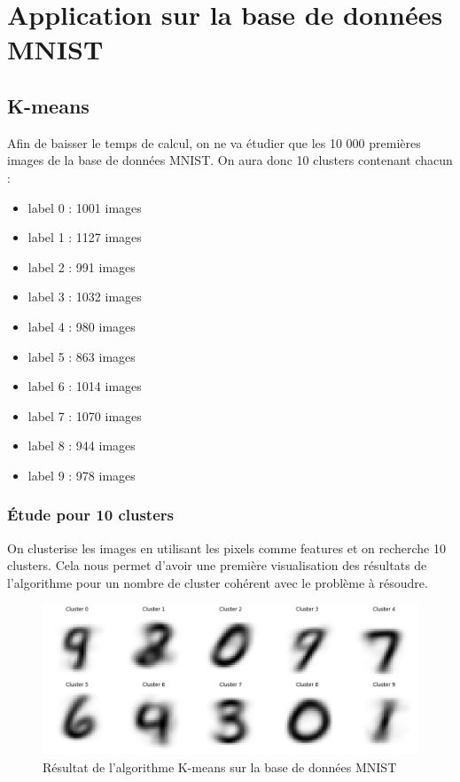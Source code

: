 \documentclass[french,a4paper,18pt]{article}
\begin{document}
\section{Application sur la base de données MNIST}
\subsection{K-means}

Afin de baisser le temps de calcul, on ne va étudier que les 10 000 premières images de la base de données MNIST.
On aura donc 10 clusters contenant chacun : 
\begin{itemize}
    \item label 0 : 1001 images
    \item label 1 : 1127 images
    \item label 2 : 991 images
    \item label 3 : 1032 images
    \item label 4 : 980 images
    \item label 5 : 863 images
    \item label 6 : 1014 images
    \item label 7 : 1070 images
    \item label 8 : 944 images
    \item label 9 : 978 images
\end{itemize}

\subsubsection{Étude pour 10 clusters}

On clusterise les images en utilisant les pixels comme features et on recherche 10 clusters.
Cela nous permet d'avoir une première visualisation des résultats de l'algorithme pour un nombre 
de cluster cohérent avec le problème à résoudre.

\begin{figure}[h!]
    \centering
    \includegraphics[scale=0.25]{images/mnist_kmeans_ten_clusters.png}
    \caption{Résultat de l'algorithme K-means sur la base de données MNIST}\label{fig:mnist_kmeans}
\end{figure}
\end{document}
